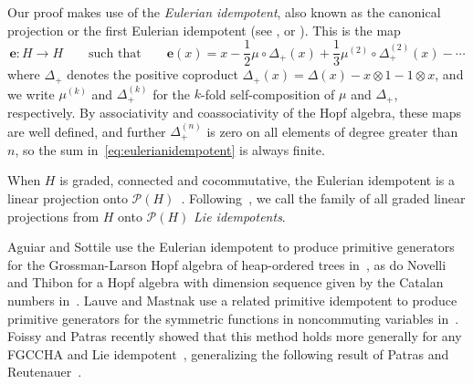 \documentclass[11pt]{amsart}
\theoremstyle{definition}
\numberwithin{equation}{section}
\newcommand{\FGCCHA}{\textsf{FGCCHA}\xspace}
\newcommand{\lucas}[1]{\todo[size=\tiny,color=red!50]{#1 \\ \hfill --- Lucas}}
\begin{document}
Our proof makes use of the \emph{Eulerian idempotent}, also known as the canonical projection or the first Eulerian idempotent (see \cite{P94}, \cite[\S 1.4]{AS05cc} or \cite[\S 4.5.2]{loday2013cyclic}).  This is the map
\begin{equation}
\label{eq:eulerianidempotent}
\mathbf{e}: H \to H
\qquad\text{such that}\qquad
\mathbf{e}(x) = x - \frac{1}{2}\mu \circ \Delta_{+}(x) + \frac{1}{3} \mu^{(2)} \circ \Delta_{+}^{(2)}(x) - \cdots 
\end{equation}
where $\Delta_{+}$ denotes the positive coproduct $\Delta_{+}(x) = \Delta(x) - x \otimes 1 - 1 \otimes x$,
and we write $\mu^{(k)}$ and $\Delta^{(k)}_{+}$ for the $k$-fold self-composition of $\mu$ and $\Delta_{+}$, respectively.  
By associativity and coassociativity of the Hopf algebra, these maps are well defined, and further $\Delta_{+}^{(n)}$ is zero on all elements of degree greater than $n$, so the sum in~\eqref{eq:eulerianidempotent} is always finite.

When $H$ is graded, connected and cocommutative, the Eulerian idempotent is a linear projection onto $\mathcal{P}(H)$~\cite[Theorem 9.4]{S94}.
Following~\cite{P99}, we call the family of all graded linear projections from $H$ onto $\mathcal{P}(H)$ \emph{Lie idempotents}.

Aguiar and Sottile use the Eulerian idempotent to produce primitive generators for the Grossman-Larson
Hopf algebra of heap-ordered trees in~\cite{AS05cc},
as do Novelli and Thibon for a Hopf algebra with dimension sequence given by the Catalan numbers in~\cite[\S 5]{NT05}.
Lauve and Mastnak use a related primitive idempotent to produce primitive generators for
the symmetric functions in noncommuting variables in~\cite{LM11}.  
Foissy and Patras recently showed that this method holds more generally for any \FGCCHA and Lie idempotent~\cite{FP24}, 
generalizing the following result of Patras and Reutenauer~\cite{PR04}.
\end{document}
